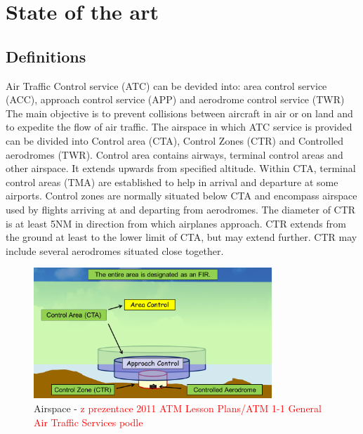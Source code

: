 \chapter{State of the art}



\section{Definitions}

Air Traffic Control service (ATC) can be devided into: area control service (ACC), approach control service (APP) and aerodrome control service (TWR) \cite[Chapter 1]{doc4444} The main objective is to prevent collisions between aircraft in air or on land and to expedite the flow of air traffic. \cite[Chapter 2.2]{annex11}
The airspace in which ATC service is provided can be divided into Control area (CTA), Control Zones (CTR) and Controlled aerodromes (TWR). Control area contains airways, terminal control areas and other airspace. It extends upwards from specified altitude. Within CTA, terminal control areas (TMA) are established to help in arrival and departure at some airports.
Control zones are normally situated below CTA and encompass airspace used by flights arriving at and departing from aerodromes. The diameter of CTR is at least 5NM in direction from which airplanes approach. CTR extends from the ground at least to the lower limit of CTA, but may extend further. CTR may include several aerodromes situated close together. \cite[Chapter 2.10]{annex11}

\begin{figure}[h]
    \centering
    \includegraphics[width=0.8\textwidth]{figures/airspace.png}
    \caption{Airspace - \textcolor{red}{z prezentace 2011 ATM Lesson Plans/ATM 1-1 General Air Traffic Services podle \cite[Chapter 2.5]{annex11}
    }}
    \label{fig:airspace}
\end{figure}


